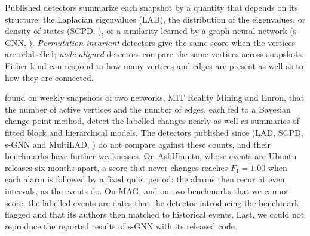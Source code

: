 \documentclass[11pt]{article}
\theoremstyle{dsplain}
\theoremstyle{definition}
\begin{document}
Published detectors summarize each snapshot by a quantity that depends on its structure: the Laplacian
eigenvalues (LAD), the distribution of the eigenvalues, or density of states (SCPD,
\citealp{huang2023fast}), or a similarity learned by a graph neural network (s-GNN,
\citealp{sulem2023graph}). \emph{Permutation-invariant} detectors give the same score when the vertices
are relabelled; \emph{node-aligned} detectors compare the same vertices across snapshots. Either kind can
respond to how many vertices and edges are present as well as to how they are connected.

\citet{kendrick2018change} found on weekly snapshots of two networks, MIT Reality Mining and Enron, that the
number of active vertices and the number of edges, each fed to a Bayesian change-point method, detect the
labelled changes nearly as well as summaries of fitted block and hierarchical models. The detectors
published since (LAD, SCPD, s-GNN and MultiLAD, \citealp{huang2024laplacian}) do not compare against these
counts, and their benchmarks have further weaknesses. On AskUbuntu, whose events are Ubuntu
releases six months apart, a score that never changes reaches $F_1 = 1.00$ when each alarm is followed by
a fixed quiet period: the alarms then recur at even intervals, as the events do. On MAG, and on two benchmarks 
that we cannot score, the labelled events are dates that the detector introducing the benchmark flagged and 
that its authors then matched to historical events. Last, we could not reproduce the reported results of s-GNN 
with its released code.
\end{document}
